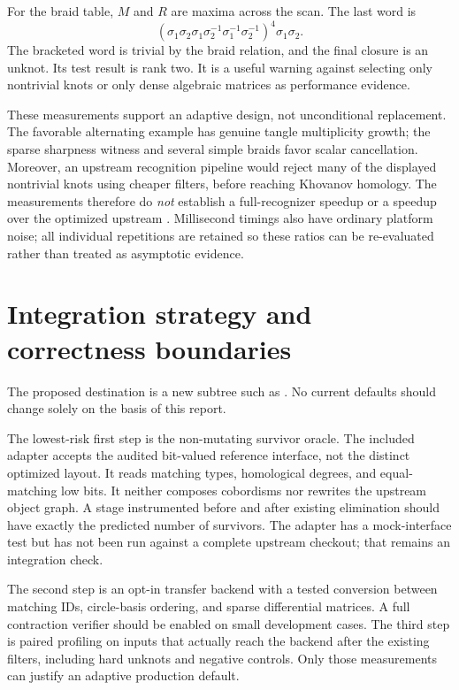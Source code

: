 \documentclass[11pt,letterpaper]{article}
\theoremstyle{definition}
\theoremstyle{remark}
\newcommand{\code}[1]{\texttt{\detokenize{#1}}}
\begin{document}

For the braid table, $M$ and $R$ are maxima across the scan. The last word is
\[
 (\sigma_1\sigma_2\sigma_1\sigma_2^{-1}\sigma_1^{-1}\sigma_2^{-1})^4
 \sigma_1\sigma_2.
\]
The bracketed word is trivial by the braid relation, and the final closure is
an unknot. Its test result is rank two. It is a useful warning against selecting
only nontrivial knots or only dense algebraic matrices as performance evidence.

These measurements support an adaptive design, not unconditional replacement.
The favorable alternating example has genuine tangle multiplicity growth; the
sparse sharpness witness and several simple braids favor scalar cancellation.
Moreover, an upstream recognition pipeline would reject many of the displayed
nontrivial knots using cheaper filters, before reaching Khovanov homology.
The measurements therefore do \emph{not} establish a full-recognizer speedup or
a speedup over the optimized upstream \code{FastScan}. Millisecond timings also
have ordinary platform noise; all individual repetitions are retained so these
ratios can be re-evaluated rather than treated as asymptotic evidence.

\section{Integration strategy and correctness boundaries}
\label{sec:integration}
The proposed destination is a new subtree such as
.
No current defaults should change solely on the basis of this report.

The lowest-risk first step is the non-mutating survivor oracle. The included
adapter accepts the audited bit-valued reference \code{ScanComplex} interface,
not the distinct optimized \code{FastScan} layout. It reads matching types,
homological degrees, and equal-matching low bits. It neither composes
cobordisms nor rewrites the upstream object graph. A stage instrumented before
and after existing elimination should have exactly the predicted number of
survivors. The adapter has a mock-interface test but has not been run against
a complete upstream checkout; that remains an integration check.

The second step is an opt-in transfer backend with a tested conversion between
matching IDs, circle-basis ordering, and sparse differential matrices. A full
contraction verifier should be enabled on small development cases. The third
step is paired profiling on inputs that actually reach the backend after the
existing filters, including hard unknots and negative controls. Only those
measurements can justify an adaptive production default.
\end{document}
